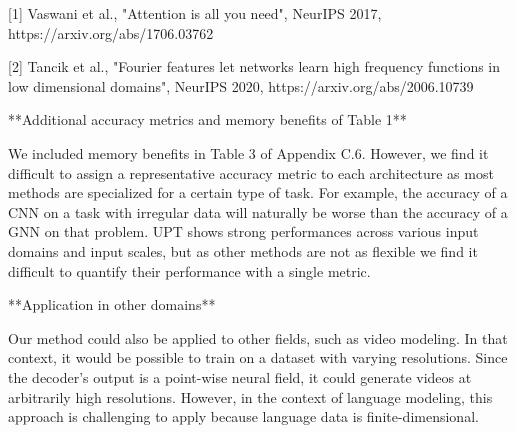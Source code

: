 [1] Vaswani et al., "Attention is all you need", NeurIPS 2017, https://arxiv.org/abs/1706.03762

[2] Tancik et al., "Fourier features let networks learn high frequency functions in low dimensional domains", NeurIPS 2020, https://arxiv.org/abs/2006.10739



**Additional accuracy metrics and memory benefits of Table 1**

We included memory benefits in Table 3 of Appendix C.6. However, we find it difficult to assign a representative accuracy metric to each architecture
as most methods are specialized for a certain type of task. For example, the accuracy of a CNN on a task with irregular data will naturally be worse than the accuracy of a GNN on that problem. UPT shows strong performances across various input domains and input scales, but as other methods are not as flexible we find it difficult to quantify their performance with a single metric.


**Application in other domains**

Our method could also be applied to other fields, such as video modeling. In that context, it would be possible to train on a dataset with varying resolutions. Since the decoder's output is a point-wise neural field, it could generate videos at arbitrarily high resolutions.
However, in the context of language modeling, this approach is challenging to apply because language data is finite-dimensional.